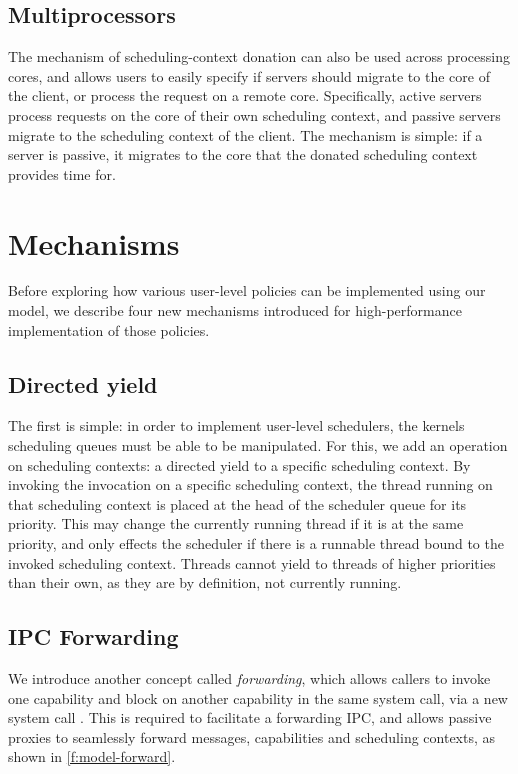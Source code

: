 \subsection{Multiprocessors}

The mechanism of scheduling-context donation can also be used across processing cores, and 
allows users to easily specify if servers should migrate to the core of the client, or 
process the request on a remote core. Specifically, active servers process requests on the core of
their own scheduling context, and passive servers migrate to the scheduling context of the client. 
The mechanism is simple: if a
server is passive, it migrates to the core that the donated scheduling context provides time for. 

\section{Mechanisms}
\label{sec:model-mechanisms}

Before exploring how various user-level policies can be implemented using our model, we describe
four new mechanisms introduced for high-performance implementation of those policies.

\subsection{Directed yield}

The first is simple: in order to implement user-level schedulers, the kernels scheduling queues
must be able to be manipulated. For this, we add an operation on scheduling contexts: a
directed yield to a specific scheduling context. By invoking the \scyieldto invocation on 
a specific scheduling context, the thread running on that scheduling context is placed at the head
of the scheduler queue for its priority. 
This may change the currently running thread if it is at the same priority, and only effects the
scheduler if there is a runnable thread bound to the invoked scheduling context. Threads cannot
yield to threads of higher priorities than their own, as they are by definition, not currently
running.

\subsection{IPC Forwarding}
\label{sec:ipc-forwarding}

We introduce another concept called \emph{forwarding}, which allows callers to
invoke one capability and block on another capability in the same system call, via
a new system call \nbsendrecv. This is required to
facilitate a forwarding IPC, and allows passive proxies to seamlessly forward messages,
capabilities and scheduling contexts, as shown in \cref{f:model-forward}. 

